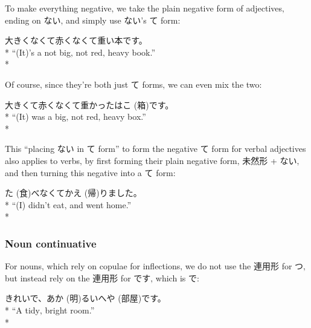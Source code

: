 \documentclass[11pt, b5paper, twoside, openright, onecolumn]{book}
\makeatletter
\newcommand*{\rubystack}[2]{{\relscale{0.5}%
  \begin{tabular}[b]{@{}c@{}}%
    {#1}\\%
   {\textscale{2}{#2}}%
  \end{tabular}}%
}
\DeclareRobustCommand*{\ruby}[2]{%
  \mbox{%
    \setlength{\parskip}{0ex}%
    \BeginAccSupp{method=pdfstringdef,ActualText={#1}}%
      \rubystack{\phantom{#2}}{#1}%
      \llap{%
        \rubystack{#2}{\phantom{#1}}%
      }%
    \EndAccSupp{}%
  }%
}
\renewcommand*{\ruby}[2]{#2 (#1)}%
\newenvironment{exampleblock}{
\setlength{\parindent}{0.6in}
\begin{minipage}[t]{\dimexpr\textwidth-\parindent}}
{\end{minipage}}
\makeatother
\begin{document}
To make everything negative‚ we take the plain negative form of adjectives‚ ending on ない‚ and simply use ない’s て form:

\vspace{0.4cm}
\begin{exampleblock}
大きくなくて赤くなくて重い本です。 \\* 
“(It)’s a not big‚ not red‚ heavy book.” \\* 
\end{exampleblock}
\vspace{0.2cm}

Of course‚ since they’re both just て forms‚ we can even mix the two:

\vspace{0.4cm}
\begin{exampleblock}
大きくて赤くなくて重かった\ruby{箱}{はこ}です。 \\* 
“(It) was a big‚ not red‚ heavy box.” \\* 
\end{exampleblock}
\vspace{0.2cm}

This “placing ない in て form” to form the negative て form for verbal adjectives also applies to verbs‚ by first forming their plain negative form‚ 未然形 + ない‚ and then turning this negative into a て form:

\vspace{0.4cm}
\begin{exampleblock}
\ruby{食}{た}べなくて\ruby{帰}{かえ}りました。 \\* 
“(I) didn’t eat‚ and went home.” \\* 
\end{exampleblock}
\subsubsection{Noun continuative}


For nouns‚ which rely on copulae for inflections‚ we do not use the 連用形 for つ‚ but instead rely on the 連用形 for です‚ which is で:

\vspace{0.4cm}
\begin{exampleblock}
きれいで、\ruby{明}{あか}るい\ruby{部屋}{へや}です。 \\* 
“A tidy‚ bright room.” \\* 
\end{exampleblock}
\vspace{0.2cm}
\end{document}
